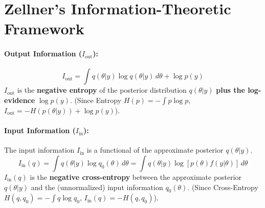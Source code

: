 \documentclass{article}
\theoremstyle{definition}
\begin{document}
\section{Zellner's Information-Theoretic Framework}
\paragraph{Output Information ($I_{\text{out}}$):}

\begin{equation}
I_{\text{out}} = \int q(\theta|y) \log q(\theta|y) \, d\theta + \log p(y)
\end{equation}
$I_{\text{out}}$ is the \textbf{negative entropy} of the posterior distribution $q(\theta|y)$ \textbf{plus the log-evidence} $\log p(y)$.
(Since Entropy $H(p) = -\int p \log p$, $I_{\text{out}} = -H(p(\theta|y)) + \log p(y)$).

\paragraph{Input Information ($I_{\text{in}}$):}

The input information $I_{\text{in}}$ is a functional of the approximate posterior $q(\theta|y)$.
\begin{equation}
I_{\text{in}}(q) = \int q(\theta|y) \log q_0(\theta) \, d\theta = \int q(\theta|y) \log[p(\theta)f(y|\theta)] \, d\theta
\end{equation}
$I_{\text{in}}(q)$ is the \textbf{negative cross-entropy} between the approximate posterior $q(\theta|y)$
and the (unnormalized) input information $q_0(\theta)$.
(Since Cross-Entropy $H(q, q_0) = -\int q \log q_0$, $I_{\text{in}}(q) = -H(q, q_0)$).


\end{document}
